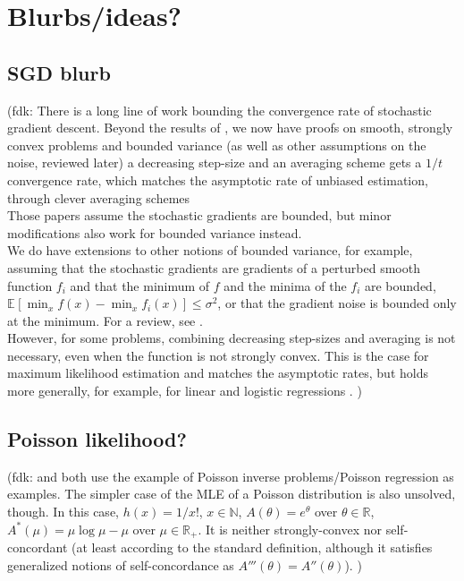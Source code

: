 \documentclass[twoside]{article}
\newcommand{\fdk}[1]{\textcolor{Periwinkle}{(fdk:#1)}}
\newcommand*{\expect}[2][]{\ensuremath{\mathbb{E}_{#1} \left[ #2 \right] }} %
\newcommand{\m}{\mu}
\begin{document}
\section{Blurbs/ideas?}



\subsection{SGD blurb}
\fdk{
%
There is a long line of work bounding the convergence rate of stochastic gradient descent.
Beyond the results of \citet{robbins1951stochastic},
we now have proofs on smooth, strongly convex problems and bounded variance
(as well as other assumptions on the noise, reviewed later)
a decreasing step-size and an averaging scheme gets
a $1/t$ convergence rate,
which matches the asymptotic rate of unbiased estimation,
through clever averaging schemes \citep{rakhlin2012making,lacostejulien2012simpler}
\\
Those papers assume the stochastic gradients are bounded,
but minor modifications also work for bounded variance instead.
\\
We do have extensions to other notions of bounded variance,
for example, assuming that the stochastic gradients are gradients of a perturbed smooth function $f_i$
and that the minimum of $f$ and the minima of the $f_i$
are bounded, $\expect{\min_x f(x) - \min_x f_i(x)} \leq \sigma^2$,
or that the gradient noise is bounded only at the minimum.
For a review, see \citet{gower2019sgd}.
\\
However, for some problems, combining decreasing step-sizes and averaging is not necessary,
even when the function is not strongly convex.
This is the case for maximum likelihood estimation and matches the asymptotic rates,
but holds more generally, for example, for linear and logistic regressions \citep{bach2013nonstronglyconvex,moulines2011non}.
}


\subsection{Poisson likelihood?}
\fdk{
\citet{bauschke2017descent} and \citet{hanzely2018fastest} both use the example of Poisson inverse problems/Poisson regression
as examples.
The simpler case of the MLE of a Poisson distribution is also unsolved, though.
In this case, $h(x) = 1/x!$, $x \in \mathbb{N}$, $A(\theta) = e^\theta$ over $\theta \in \mathbb{R}$,
$A^*(\m) = \m \log \m - \m$ over $\m \in \mathbb{R}_+$.
It is neither strongly-convex nor self-concordant (at least according to the standard definition,
although it satisfies generalized notions of self-concordance as $A'''(\theta) = A''(\theta)$).
}
\end{document}
